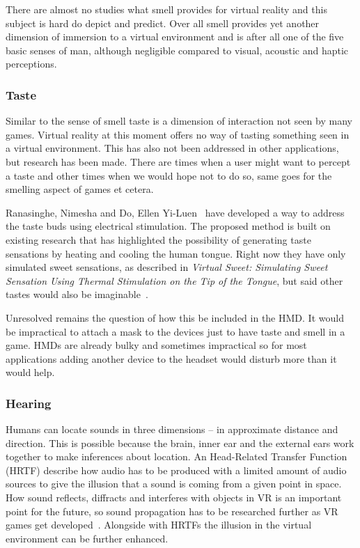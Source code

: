 There are almost no studies what smell provides for virtual reality and this subject is hard do depict and predict. Over all smell provides yet another dimension of immersion to a virtual environment and is after all one of the five basic senses of man, although negligible compared to visual, acoustic and haptic perceptions.

\subsubsection{Taste}

Similar to the sense of smell taste is a dimension of interaction not seen by many games. Virtual reality at this moment offers no way of tasting something seen in a virtual environment. This has also not been addressed in other applications, but research has been made. There are times when a user might want to percept a taste and other times when we would hope not to do so, same goes for the smelling aspect of games et cetera.

Ranasinghe, Nimesha and Do, Ellen Yi-Luen~\cite{Ranasinghe:2016:VSS:2984751.2985729} have developed a way to address the taste buds using electrical stimulation. The proposed method is built on existing research that has highlighted the possibility of generating taste sensations by heating and cooling the human tongue. Right now they have only simulated sweet sensations, as described in \textit{Virtual Sweet: Simulating Sweet Sensation Using Thermal	Stimulation on the Tip of the Tongue}, but said other tastes would also be imaginable~\cite{Ranasinghe:2016:VSS:2984751.2985729}.

Unresolved remains the question of how this be included in the HMD. It would be impractical to attach a mask to the devices just to have taste and smell in a game. HMDs are already bulky and sometimes impractical so for most applications adding another device to the headset would disturb more than it would help.

\subsubsection{Hearing}

Humans can locate sounds in three dimensions – in approximate distance and direction. This is possible because the brain, inner ear and the external ears work together to make inferences about location.\newline
An Head-Related Transfer Function (HRTF) describe how audio has to be produced with a limited amount of audio sources to give the illusion that a sound is coming from a given point in space.\newline
How sound reflects, diffracts and interferes with objects in VR is an important point for the future, so sound propagation has to be researched further as VR games get developed~\cite{online:oculusKeynote}. Alongside with HRTFs the illusion in the virtual environment can be further enhanced.

